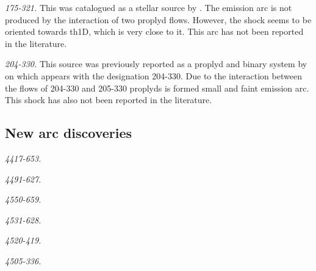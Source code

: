 \documentclass[iop, apj]{emulateapj}
\renewcommand\clearpage{}
\begin{document}
\textit{175-321.} This was catalogued as a stellar source by \citet{ODell:1996a}. The emission arc is not produced by the interaction of two proplyd flows. However, the shock seems to be oriented towards th1D, which is very close to it. This arc has not been reported in the literature.

\textit{204-330.} This source was previously reported as a proplyd and binary system by \citet{Ricci:2008a} on which appears with the designation 204-330.  Due to the interaction between the flows of 204-330 and 205-330 proplyds is formed small and faint emission arc. This shock has also not been reported in the literature.

\clearpage
\subsection{New arc discoveries}
\label{sec:problematic-group}


\label{sec:notshell}

\textit{4417-653.} 

\textit{4491-627.} 

\textit{4550-659.} 

\textit{4531-628.} 

\textit{4520-419.} 

\textit{4505-336.} 
\end{document}
